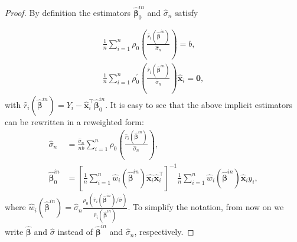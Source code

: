\documentclass[11pt]{article}
\begin{document}
\begin{proof}

By definition the estimators $\widehat{\boldsymbol{\beta}}_0^{in} $ and $\widehat{\sigma}_n$ satisfy

\begin{align*}
\frac{1}{n} \sum_{i=1}^n \rho_{0} \left( \frac{\widehat{r}_i(\widehat{\boldsymbol{\beta}}^{in})}{\widehat{\sigma}_n} \right) = b, \\
\frac{1}{n} \sum_{i=1}^n \rho_{0}^{\prime} \left( \frac{\widehat{r}_i(\widehat{\boldsymbol{\beta}}^{in})}{\widehat{\sigma}_n} \right) \widehat{\mathbf{x}}_i = \mathbf{0} ,
\end{align*}
with $\widehat{r}_i(\widehat{\boldsymbol{\beta}}^{in}) = Y_i  - \mathbf{\widehat{x}}_i^{\top} \boldsymbol{\widehat{\beta}}_0^{in}$. It is easy to see that the above implicit estimators can be rewritten in a reweighted form:
\begin{align*}
\widehat{\sigma}_n &= \frac{\widehat{\sigma}_n}{nb} \sum_{i=1}^n  \rho_0 \left(  \frac{ \widehat{r}_i \left(\widehat{\boldsymbol{\beta}}^{in} \right) }{\widehat{\sigma}_n} \right), \\
\widehat{\boldsymbol{\beta}}_0^{in} &= \left[ \frac{1}{n} \sum_{i=1}^n  \widehat{w}_i \left( \widehat{\boldsymbol{\beta}}^{in} \right)   \widehat{\mathbf{x}_i} \widehat{\mathbf{x}}_i^{\top} \right]^{-1} \frac{1}{n} \sum_{i=1}^n  \widehat{w}_i \left( \widehat{\boldsymbol{\beta}}^{in} \right) \mathbf{\widehat{x}}_i y_i,
\end{align*}
where $\widehat{w}_i(\widehat{\boldsymbol{\beta}}^{in} ) = \widehat{\sigma}_n\frac{ \rho_0 \left( \widehat{r}_i \left( \widehat{\boldsymbol{\beta}}^{in}\right)/\widehat{\sigma} \right) }{ \widehat{r}_i \left( \widehat{\boldsymbol{\beta}}^{in} \right)}$. To simplify the notation, from now on we write $\widehat{\boldsymbol{\beta}}$ and $\widehat{\sigma}$ instead of $\widehat{\boldsymbol{\beta}}^{in}$ and $\widehat{\sigma}_n$, respectively.


\end{proof}
\end{document}
